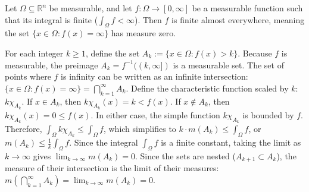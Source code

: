 \begin{lemma}
    Let $\Omega \subseteq \mathbb{R}^n$ be measurable, and let $f : \Omega \rightarrow [0, \infty]$ be a measurable function such that its integral is finite ($\int_\Omega f < \infty$). Then $f$ is finite almost everywhere, meaning the set $\{x \in \Omega : f(x) = \infty\}$ has measure zero.
\end{lemma}
\begin{pfbox}
    For each integer $k \ge 1$, define the set $A_k := \{x \in \Omega : f(x) > k\}$. Because $f$ is measurable, the preimage $A_k = f^{-1}((k, \infty])$ is a measurable set.
    The set of points where $f$ is infinity can be written as an infinite intersection: $\{x \in \Omega : f(x) = \infty\} = \displaystyle\bigcap_{k=1}^\infty A_k$.
    Define the characteristic function scaled by $k$: $k \chi_{A_k}$.
    If $x \in A_k$, then $k \chi_{A_k}(x) = k < f(x)$. If $x \notin A_k$, then $k \chi_{A_k}(x) = 0 \le f(x)$. In either case, the simple function $k \chi_{A_k}$ is bounded by $f$.
    Therefore, $\int_\Omega k \chi_{A_k} \le \int_\Omega f$, which simplifies to $k \cdot m(A_k) \le \int_\Omega f$, or $m(A_k) \le \frac{1}{k} \int_\Omega f$.
    Since the integral $\int_\Omega f$ is a finite constant, taking the limit as $k \to \infty$ gives $\displaystyle\lim_{k\to\infty} m(A_k) = 0$.
    Since the sets are nested ($A_{k+1} \subset A_k$), the measure of their intersection is the limit of their measures: $m\left(\displaystyle\bigcap_{k=1}^\infty A_k\right) = \displaystyle\lim_{k\to\infty} m(A_k) = 0$.
\end{pfbox}

